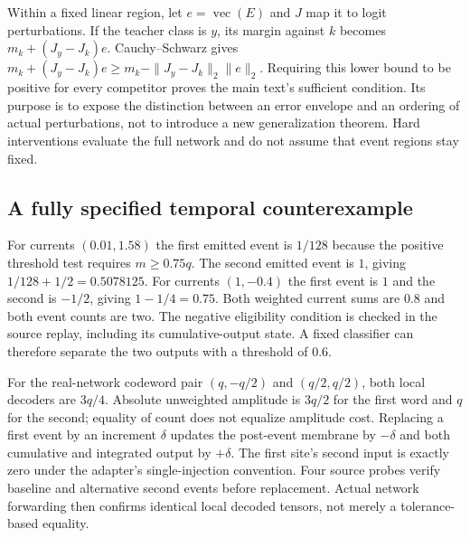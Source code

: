\documentclass[10pt,twocolumn,letterpaper]{article}
\begin{document}
Within a fixed linear region, let $e=\operatorname{vec}(E)$ and $J$ map it to logit perturbations. If the teacher class is $y$, its margin against $k$ becomes $m_k+(J_y-J_k)e$. Cauchy--Schwarz gives $m_k+(J_y-J_k)e\geq m_k-\|J_y-J_k\|_2\|e\|_2$. Requiring this lower bound to be positive for every competitor proves the main text's sufficient condition. Its purpose is to expose the distinction between an error envelope and an ordering of actual perturbations, not to introduce a new generalization theorem. Hard interventions evaluate the full network and do not assume that event regions stay fixed.

\subsection{A fully specified temporal counterexample}
For currents $(0.01,1.58)$ the first emitted event is $1/128$ because the positive threshold test requires $m\geq0.75q$. The second emitted event is $1$, giving $1/128+1/2=0.5078125$. For currents $(1,-0.4)$ the first event is $1$ and the second is $-1/2$, giving $1-1/4=0.75$. Both weighted current sums are $0.8$ and both event counts are two. The negative eligibility condition is checked in the source replay, including its cumulative-output state. A fixed classifier can therefore separate the two outputs with a threshold of $0.6$.

For the real-network codeword pair $(q,-q/2)$ and $(q/2,q/2)$, both local decoders are $3q/4$. Absolute unweighted amplitude is $3q/2$ for the first word and $q$ for the second; equality of count does not equalize amplitude cost. Replacing a first event by an increment $\delta$ updates the post-event membrane by $-\delta$ and both cumulative and integrated output by $+\delta$. The first site's second input is exactly zero under the adapter's single-injection convention. Four source probes verify baseline and alternative second events before replacement. Actual network forwarding then confirms identical local decoded tensors, not merely a tolerance-based equality.
\end{document}
